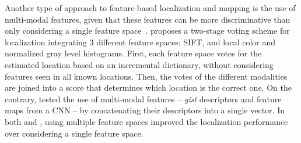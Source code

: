 Another type of approach to feature-based localization and mapping is the use of multi-modal features, given that these features can be more discriminative than only considering a single feature space~\parencite{latif-et-al:2017:016}.
\cite{filliat:2007:364080} proposes a two-stage voting scheme for localization integrating 3 different feature spaces: SIFT, and local color and normalized gray level histograms. First, each feature space votes for the estimated location based on an incremental dictionary, without considering features seen in all known locations. Then, the votes of the different modalities are joined into a score that determines which location is the correct one.
On the contrary, \cite{latif-et-al:2017:016} tested the use of multi-modal features -- \textit{gist} descriptors and feature maps from a CNN -- by concatenating their descriptors into a single vector. 
In both \cite{filliat:2007:364080} and \cite{latif-et-al:2017:016}, using multiple feature spaces improved the localization performance over considering a single feature space.


